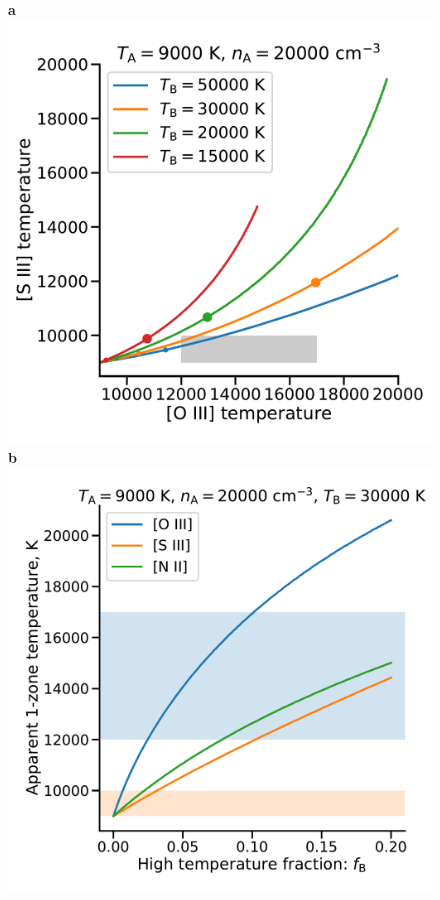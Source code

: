 \documentclass[twocolumn,linenumbers]{aastex63}
\begin{document}
\begin{figure}
  \textbf{\Large a}\\
  \includegraphics[width=\linewidth]{two-temp-Toiii-Tsiii}\\
  \textbf{\Large b}\\
  \includegraphics[width=\linewidth]{two-temp-TB-30000}

\end{figure}
\end{document}
